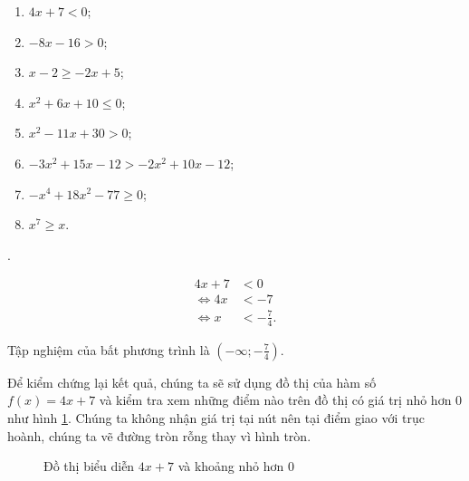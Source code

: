\begin{multicols}{2}
   \begin{enumerate}
      \item $4x + 7 < 0$;
      \item $-8x - 16 > 0$;
      \item $x - 2 \geq -2x + 5$;
      \item $x^2 + 6x + 10 \leq 0$;
      \item $x^2 - 11x + 30 > 0$;
      \item $-3x^2 + 15x - 12 > -2x^2 + 10x - 12$;
      \item $-x^4 + 18x^2 - 77 \geq 0$;
      \item $x^7 \geq x$.
   \end{enumerate}
\end{multicols}

\solution

{ 
   \begin{minipageindent}{0.55\textwidth}
      \setcounter{subexercise}{1}
      . 

      \begin{align*}
         4x + 7 &< 0 \\
         \iff 4x &< -7 \\
         \iff x &< -\frac{7}{4}.
      \end{align*}
      
      Tập nghiệm của bất phương trình là $\displaystyle\left(-\infty; -\frac{7}{4}\right)$.

      Để kiểm chứng lại kết quả, chúng ta sẽ sử dụng đồ thị của hàm số $f(x) = 4x + 7$ và kiểm tra xem những điểm nào trên đồ thị có giá trị nhỏ hơn $0$ như hình \ref{fig:ham_so_mot_bien:da_thuc:gbpt1}. Chúng ta không nhận giá trị tại nút nên tại điểm giao với trục hoành, chúng ta vẽ đường tròn rỗng thay vì hình tròn.
   \end{minipageindent}
   \hfill
   \begin{minipageindent}{0.4\textwidth}
      \begin{figure}[H]
         \centering
         \caption{Đồ thị biểu diễn $4x + 7$ và khoảng nhỏ hơn $0$}
         \label{fig:ham_so_mot_bien:da_thuc:gbpt1}
      \end{figure}
   \end{minipageindent}
}


